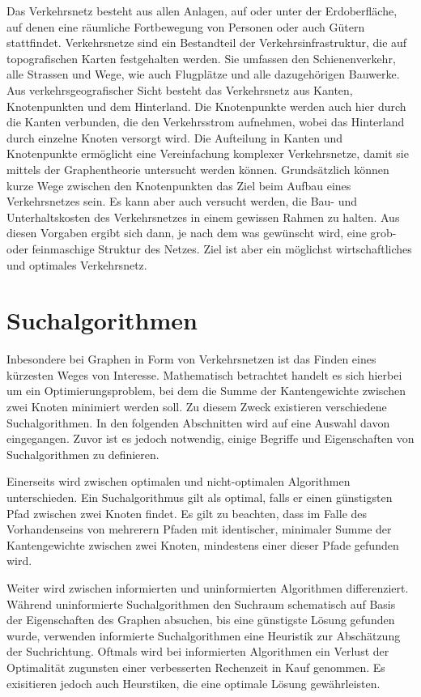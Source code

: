 \label{section:verkehr/einfuehrung}

Das Verkehrsnetz besteht aus allen Anlagen, auf oder unter der Erdoberfläche, auf denen eine räumliche Fortbewegung von Personen oder auch Gütern stattfindet. Verkehrsnetze sind ein Bestandteil der Verkehrsinfrastruktur, die auf topografischen Karten festgehalten werden. Sie umfassen den Schienenverkehr, alle Strassen und Wege, wie auch Flugplätze und alle dazugehörigen Bauwerke.
Aus verkehrsgeografischer Sicht besteht das Verkehrsnetz aus Kanten, Knotenpunkten und dem Hinterland. Die Knotenpunkte werden auch hier durch die Kanten verbunden, die den Verkehrsstrom aufnehmen, wobei das Hinterland durch einzelne Knoten versorgt wird. Die Aufteilung in Kanten und Knotenpunkte ermöglicht eine Vereinfachung komplexer Verkehrsnetze, damit sie mittels der Graphentheorie untersucht werden können.
Grundsätzlich können kurze Wege zwischen den Knotenpunkten das Ziel beim Aufbau eines Verkehrsnetzes sein. Es kann aber auch versucht werden, die Bau- und Unterhaltskosten des Verkehrsnetzes in einem gewissen Rahmen zu halten. Aus diesen Vorgaben ergibt sich dann, je nach dem was gewünscht wird, eine grob- oder feinmaschige Struktur des Netzes.
Ziel ist aber ein möglichst wirtschaftliches und optimales Verkehrsnetz.

\section{Suchalgorithmen}
Inbesondere bei Graphen in Form von Verkehrsnetzen ist das Finden eines kürzesten Weges von Interesse. Mathematisch betrachtet handelt es sich hierbei um ein Optimierungsproblem, bei dem die Summe der Kantengewichte zwischen zwei Knoten minimiert werden soll. Zu diesem Zweck existieren verschiedene Suchalgorithmen. In den folgenden Abschnitten wird auf eine Auswahl davon eingegangen. Zuvor ist es jedoch notwendig, einige Begriffe und Eigenschaften von Suchalgorithmen zu definieren.

Einerseits wird zwischen optimalen und nicht-optimalen Algorithmen unterschieden. Ein Suchalgorithmus gilt als optimal, falls er einen günstigsten Pfad zwischen zwei Knoten findet. Es gilt zu beachten, dass im Falle des Vorhandenseins von mehrerern Pfaden mit identischer, minimaler Summe der Kantengewichte zwischen zwei Knoten, mindestens einer dieser Pfade gefunden wird.

Weiter wird zwischen informierten und uninformierten Algorithmen differenziert. Während uninformierte Suchalgorithmen den Suchraum schematisch auf Basis der Eigenschaften des Graphen absuchen, bis eine günstigste Lösung gefunden wurde, verwenden informierte Suchalgorithmen eine Heuristik zur Abschätzung der Suchrichtung. Oftmals wird bei informierten Algorithmen ein Verlust der Optimalität zugunsten einer verbesserten Rechenzeit in Kauf genommen. Es exisitieren jedoch auch Heurstiken, die eine optimale Lösung gewährleisten.

